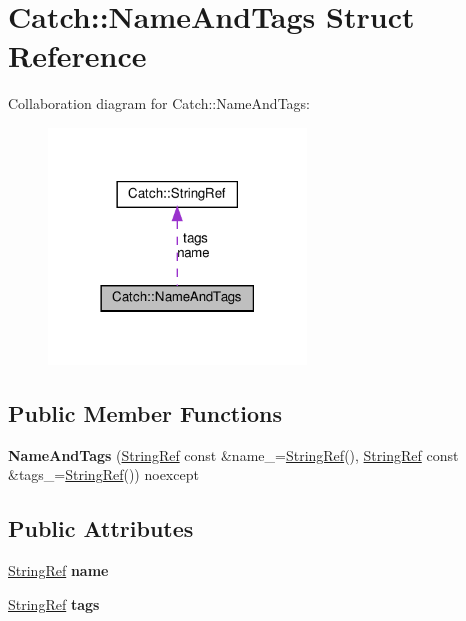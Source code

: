 \hypertarget{structCatch_1_1NameAndTags}{}\section{Catch\+::Name\+And\+Tags Struct Reference}
\label{structCatch_1_1NameAndTags}


Collaboration diagram for Catch\+::Name\+And\+Tags\+:
\nopagebreak
\begin{figure}[H]
\begin{center}
\leavevmode
\includegraphics[width=194pt]{structCatch_1_1NameAndTags__coll__graph}
\end{center}
\end{figure}
\subsection*{Public Member Functions}
\begin{DoxyCompactItemize}
\item 
\mbox{\label{structCatch_1_1NameAndTags_ab585111e615ce8c504a2b9630de8ee94}} 
{\bfseries Name\+And\+Tags} (\mbox{\hyperlink{classCatch_1_1StringRef}{String\+Ref}} const \&name\+\_\+=\mbox{\hyperlink{classCatch_1_1StringRef}{String\+Ref}}(), \mbox{\hyperlink{classCatch_1_1StringRef}{String\+Ref}} const \&tags\+\_\+=\mbox{\hyperlink{classCatch_1_1StringRef}{String\+Ref}}()) noexcept
\end{DoxyCompactItemize}
\subsection*{Public Attributes}
\begin{DoxyCompactItemize}
\item 
\mbox{\label{structCatch_1_1NameAndTags_a7cbea60e0cebfa622c667008eb011420}} 
\mbox{\hyperlink{classCatch_1_1StringRef}{String\+Ref}} {\bfseries name}
\item 
\mbox{\label{structCatch_1_1NameAndTags_a74062ed1138834a348424eb7ed900c57}} 
\mbox{\hyperlink{classCatch_1_1StringRef}{String\+Ref}} {\bfseries tags}
\end{DoxyCompactItemize}


